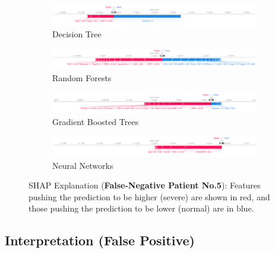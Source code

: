 \begin{figure}
    \centering
    \begin{subfigure}[b]{\textheight}
        \centering
        \includegraphics[width=\textheight]{figures/chapter_interp/shap_dt_5.png}
        \caption{Decision Tree}
        \label{fig:shap_dt_5}
    \end{subfigure}
    \vfill
    \begin{subfigure}[b]{\textheight}
        \centering
        \includegraphics[width=\textheight]{figures/chapter_interp/shap_rf_5.png}
        \caption{Random Forests}
        \label{fig:shap_rf_5}
    \end{subfigure}
    \vfill
    \begin{subfigure}[b]{\textheight}
        \centering
        \includegraphics[width=\textheight]{figures/chapter_interp/shap_xgbc_5.png}
        \caption{Gradient Boosted Trees}
        \label{fig:shap_xgbc_5}
    \end{subfigure}
    \vfill
    \begin{subfigure}[b]{\textheight}
        \centering
        \includegraphics[width=\textheight]{figures/chapter_interp/shap_nn_5.png}
        \caption{Neural Networks}
        \label{fig:shap_nn_5}
    \end{subfigure}
  \caption{SHAP Explanation (\textbf{False-Negative Patient No.5}): Features pushing the prediction to be higher (severe) are shown in red, and those pushing the prediction to be lower (normal) are in blue.}
  \label{fig:shap_5}
\end{figure}



\clearpage

\subsection{Interpretation (False Positive)}

